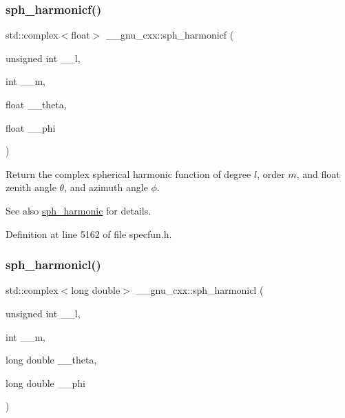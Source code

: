 \subsubsection{\texorpdfstring{sph\+\_\+harmonicf()}{sph\_harmonicf()}}
{\footnotesize\ttfamily std\+::complex$<$float$>$ \+\_\+\+\_\+gnu\+\_\+cxx\+::sph\+\_\+harmonicf (\begin{DoxyParamCaption}\item[{unsigned int}]{\+\_\+\+\_\+l,  }\item[{int}]{\+\_\+\+\_\+m,  }\item[{float}]{\+\_\+\+\_\+theta,  }\item[{float}]{\+\_\+\+\_\+phi }\end{DoxyParamCaption})\hspace{0.3cm}{\ttfamily [inline]}}

Return the complex spherical harmonic function of degree $ l $, order $ m $, and {\ttfamily float} zenith angle $ \theta $, and azimuth angle $ \phi $.

\begin{DoxySeeAlso}{See also}
\hyperlink{group__gnu__math__spec__func_gacbff28988d5d36f0c3b3fe03d4f57896}{sph\+\_\+harmonic} for details. 
\end{DoxySeeAlso}


Definition at line 5162 of file specfun.\+h.

\mbox{\label{group__gnu__math__spec__func_ga414c8374b4579aa14e38f5401304b6fa}} 
\subsubsection{\texorpdfstring{sph\+\_\+harmonicl()}{sph\_harmonicl()}}
{\footnotesize\ttfamily std\+::complex$<$long double$>$ \+\_\+\+\_\+gnu\+\_\+cxx\+::sph\+\_\+harmonicl (\begin{DoxyParamCaption}\item[{unsigned int}]{\+\_\+\+\_\+l,  }\item[{int}]{\+\_\+\+\_\+m,  }\item[{long double}]{\+\_\+\+\_\+theta,  }\item[{long double}]{\+\_\+\+\_\+phi }\end{DoxyParamCaption})\hspace{0.3cm}{\ttfamily [inline]}}

